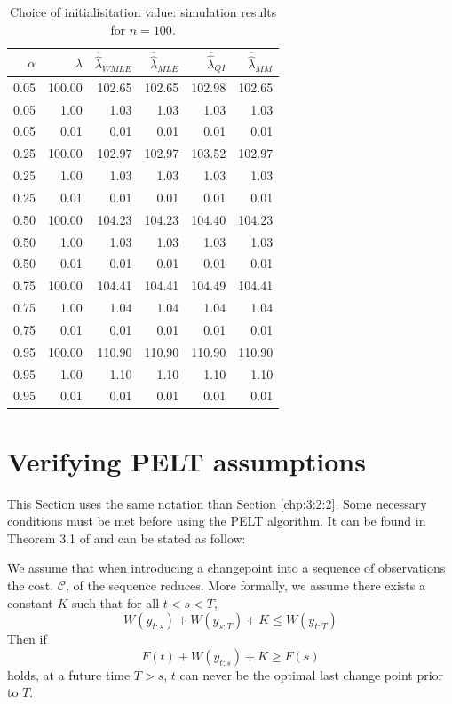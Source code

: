\begin{appendices}
\begin{table}[ht]
\centering
\begin{tabular}{|rr||rrrr|}
\hline
 $\alpha$ & $\lambda$ & $\overline{\hat\lambda}_{WMLE}$ & $\overline{\hat\lambda}_{MLE}$ & $\overline{\hat\lambda}_{QI}$ & $\overline{\hat\lambda}_{MM}$ \\ 
  \hline
  \hline
0.05 & 100.00 & 102.65 & 102.65 & 102.98 & 102.65 \\ 
  0.05 & 1.00 & 1.03 & 1.03 & 1.03 & 1.03 \\ 
  0.05 & 0.01 & 0.01 & 0.01 & 0.01 & 0.01 \\ 
  0.25 & 100.00 & 102.97 & 102.97 & 103.52 & 102.97 \\ 
  0.25 & 1.00 & 1.03 & 1.03 & 1.03 & 1.03 \\ 
  0.25 & 0.01 & 0.01 & 0.01 & 0.01 & 0.01 \\ 
  0.50 & 100.00 & 104.23 & 104.23 & 104.40 & 104.23 \\ 
  0.50 & 1.00 & 1.03 & 1.03 & 1.03 & 1.03 \\ 
  0.50 & 0.01 & 0.01 & 0.01 & 0.01 & 0.01 \\ 
  0.75 & 100.00 & 104.41 & 104.41 & 104.49 & 104.41 \\ 
  0.75 & 1.00 & 1.04 & 1.04 & 1.04 & 1.04 \\ 
  0.75 & 0.01 & 0.01 & 0.01 & 0.01 & 0.01 \\ 
  0.95 & 100.00 & 110.90 & 110.90 & 110.90 & 110.90 \\ 
  0.95 & 1.00 & 1.10 & 1.10 & 1.10 & 1.10 \\ 
  0.95 & 0.01 & 0.01 & 0.01 & 0.01 & 0.01 \\ 
   \hline
\end{tabular}
\caption{Choice of initialisitation value: simulation results for $n = 100$.}\label{tab:sim:init2}
\end{table}

\section{Verifying PELT assumptions}\label{app:chap4:3}

This Section uses the same notation than Section \ref{chp:3:2:2}. Some necessary conditions must be met before using the PELT algorithm. It can be found in Theorem 3.1 of \cite{Killick2012} and can be stated as follow:  
\begin{proposition}
    We assume that  when  introducing a changepoint into a sequence of observations the  cost, $\mathcal{C}$, of the sequence reduces. More formally, we assume there exists a constant $K$ such that for all $t<s<T$,
    \begin{equation}\label{app:pelt}
      W(y_{t:s}) + W(y_{s:T}) + K \leq W(y_{t:T})  
    \end{equation}
    Then if
    \begin{equation}\label{app:pelt2}
      F(t)+W(y_{t:s})+K \geq F(s)  
    \end{equation}
    holds, at a future time $T>s$, $t$ can never be the optimal last change point prior to $T$.
\end{proposition}


\end{appendices}
